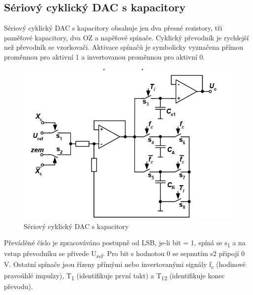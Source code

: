 \subsection{Sériový cyklický DAC s kapacitory}
Sériový cyklický DAC s kapacitory obsahuje jen dva přesné rezistory, tři paměťové kapacitory, dva OZ a napěťové spínače. Cyklický převodník je rychlejší než převodník se vzorkovači. Aktivace spínačů je symbolicky vyznačena přímou proměnnou pro aktivní 1 a invertovanou proměnnou pro aktivní 0.
\begin{figure}[h]
   \begin{center}
     \includegraphics[scale=0.6]{images/DAser2.png}
   \end{center}
   \caption{Sériový cyklický DAC s kapacitory}
\end{figure}

Převáděné číslo je zpracováváno postupně od LSB, je-li bit = 1, spíná se s\textsubscript{1} a na vstup převodníku se přivede U\textsubscript{ref}. Pro bit s hodnotou 0 se sepnutím s2 připojí 0 V. Ostatní spínače jsou řízeny přímými nebo invertovanými signály f\textsubscript{c} (hodinové pravoúhlé impulzy), T\textsubscript{1} (identifikuje první takt) a T\textsubscript{12} (identifikuje konec převodu).

